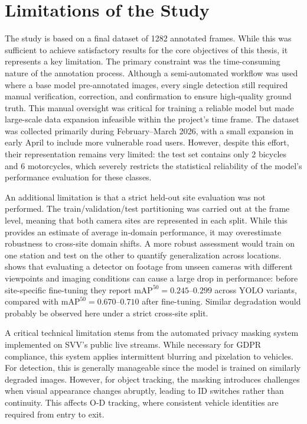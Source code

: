 \section{Limitations of the Study}
\label{sec:discussion_limitations}
The study is based on a final dataset of 1282 annotated frames. While this was sufficient to achieve satisfactory results for the core objectives of this thesis, it represents a key limitation. The primary constraint was the time-consuming nature of the annotation process. Although a semi-automated workflow was used where a base model pre-annotated images, every single detection still required manual verification, correction, and confirmation to ensure high-quality ground truth. This manual oversight was critical for training a reliable model but made large-scale data expansion infeasible within the project's time frame. The dataset was collected primarily during February–March 2026, with a small expansion in early April to include more vulnerable road users. However, despite this effort, their representation remains very limited: the test set contains only 2 bicycles and 6 motorcycles, which severely restricts the statistical reliability of the model’s performance evaluation for these classes.

An additional limitation is that a strict held-out site evaluation was not performed. The train/validation/test partitioning was carried out at the frame level, meaning that both camera sites are represented in each split. While this provides an estimate of average in-domain performance, it may overestimate robustness to cross-site domain shifts. A more robust assessment would train on one station and test on the other to quantify generalization across locations. \citet{Neupane2022RealTimeVehicle} shows that evaluating a detector on footage from unseen cameras with different viewpoints and imaging conditions can cause a large drop in performance: before site-specific fine-tuning they report $\mathrm{mAP}^{50}=0.245\text{--}0.299$ across YOLO variants, compared with $\mathrm{mAP}^{50}=0.670\text{--}0.710$ after fine-tuning. Similar degradation would probably be observed here under a strict cross-site split.

A critical technical limitation stems from the automated privacy masking system implemented on SVV’s public live streams. While necessary for GDPR compliance, this system applies intermittent blurring and pixelation to vehicles. For detection, this is generally manageable since the model is trained on similarly degraded images. However, for object tracking, the masking introduces challenges when visual appearance changes abruptly, leading to ID switches rather than continuity. This affects O-D tracking, where consistent vehicle identities are required from entry to exit.

